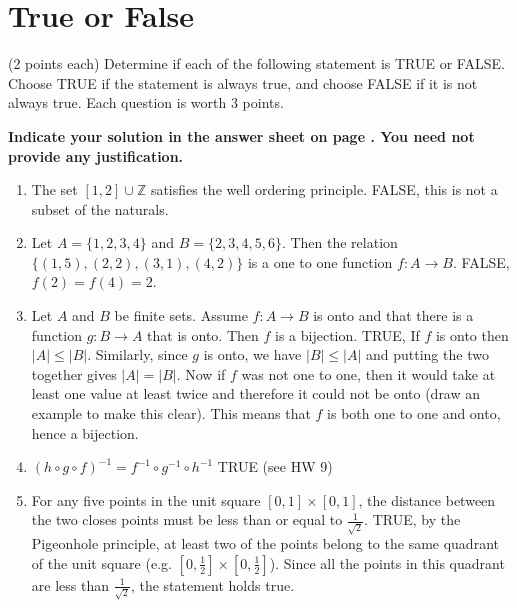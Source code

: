\documentclass[12pt]{article}
\begin{document}
\newpage
\section*{True or False}

(2 points each) Determine if each of the following statement is TRUE or FALSE.\\Choose TRUE if the statement is always true, and choose FALSE if it is not always true. Each question is worth 3 points.

\vspace{0.2cm}

\noindent
\textbf{Indicate your solution in the answer sheet on page \pageref{answersheet}.  You need not provide any justification.}


\begin{enumerate}
\item The set $[1,2]\cup\mathbb{Z}$ satisfies the well ordering principle. FALSE, this is not a subset of the naturals.
\vspace{0.6cm}
\item Let $A=\{1,2,3,4\}$ and $B=\{2,3,4,5,6\}$. Then the relation $\{(1,5), (2,2), (3,1),(4,2)\}$ is a one to one function $f:A\to B$. FALSE, $f(2)=f(4)=2$.
\vspace{0.6cm}
\item Let $A$ and $B$ be finite sets. Assume $f:A\to B$ is onto and that there is a function $g:B\to A$ that is onto. Then $f$ is a bijection. TRUE, If $f$ is onto then $|A|\leq|B|$. Similarly, since $g$ is onto, we have $|B|\leq |A|$ and putting the two together gives $|A|=|B|$. Now if $f$ was not one to one, then it would take at least one value at least twice and therefore it could not be onto (draw an example to make this clear). This means that $f$ is both one to one and onto, hence a bijection.
\vspace{0.6cm}
\item $(h\circ g\circ f)^{-1}=f^{-1}\circ g^{-1}\circ h^{-1}$ TRUE (see HW 9)
\vspace{0.6cm}
\item For any five points in the unit square $[0,1]\times[0,1]$, the distance between the two closes points must be less than or equal to $\frac{1}{\sqrt{2}}$. TRUE, by the Pigeonhole principle, at least two of the points belong to the same quadrant of the unit square (e.g. $[0,\frac{1}{2}]\times [0,\frac{1}{2}]$). Since all the points in this quadrant are less than $\frac{1}{\sqrt{2}}$, the statement holds true.
\vspace{0.6cm}

\end{enumerate}
\end{document}
